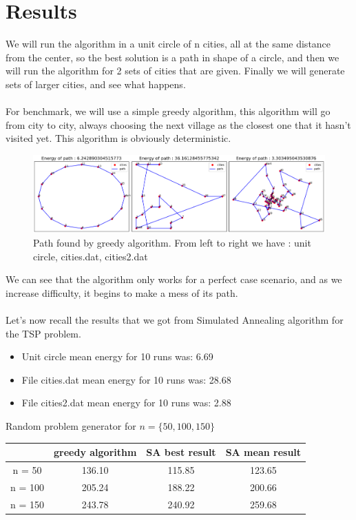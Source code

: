 \documentclass[a4paper]{article}
\begin{document}
\newpage
\section{Results}
We will run the algorithm in a unit circle of n cities, all at the same distance from the center, so the best solution is a path in shape of a circle, and then we will run the algorithm for 2 sets of cities that are given. Finally we will generate sets of larger cities, and see what happens.\\\\
For benchmark, we will use a simple greedy algorithm, this algorithm will go from city to city, always choosing the next village as the closest one that it hasn't visited yet. This algorithm is obviously deterministic. 
\begin{figure}[H]
\center
\includegraphics[width=1\textwidth]{images/algorithm_greedy.PNG}
\caption{Path found by greedy algorithm. From left to right we have : unit circle, cities.dat, cities2.dat}
\end{figure}
We can see that the algorithm only works for a perfect case scenario, and as we increase difficulty, it begins to make a mess of its path.\\\\
Let's now recall the results that we got from Simulated Annealing algorithm for the TSP problem.\\
\begin{itemize}
\item[] Unit circle mean energy for 10 runs was: 6.69
\item[] File cities.dat mean energy for 10 runs was: 28.68
\item[] File cities2.dat mean energy for 10 runs was: 2.88
\end{itemize}
\begin{center}
Random problem generator for $n = \{50, 100, 150\}$\\
\begin{tabular}{|c|c|c|c|}
\hline
        &  greedy algorithm &  SA best result &  SA mean result \\ \hline
 n = 50  &  136.10           &  115.85        &  123.65        \\ \hline
 n = 100 &  205.24           &  188.22    &  200.66         \\ \hline
 n = 150 &  243.78          &     240.92           &  259.68         \\ \hline
\end{tabular}
\end{center}
\end{document}
